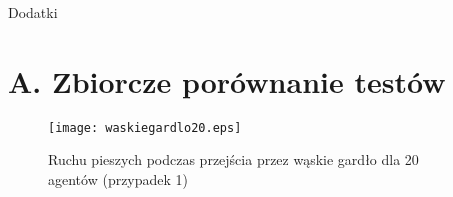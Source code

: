 
\begin{titlepage}\centering
\vspace*{\fill}
\LARGE Dodatki
\vspace*{\fill}
\end{titlepage}

\chapter{A. Zbiorcze porównanie testów}
\label{cha:dodatekA}

\begin{figure}
\label{figure:siatka}
\centering
\texttt{[image: waskiegardlo20.eps]}
\caption{Ruchu pieszych podczas przejścia przez wąskie gardło dla 20 agentów (przypadek 1)}
\end{figure}